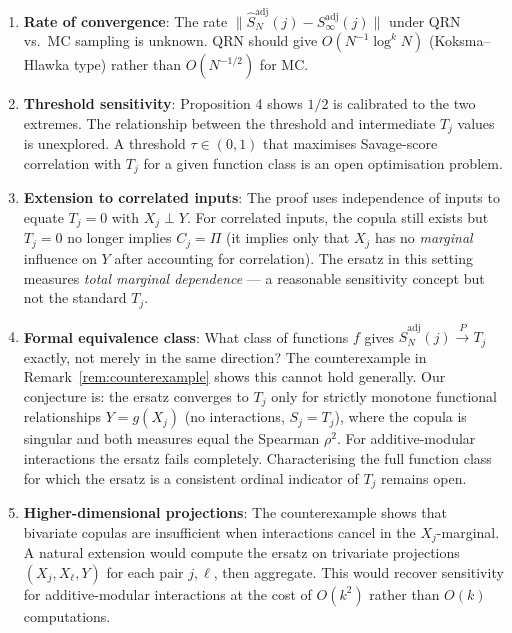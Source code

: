 \documentclass[11pt,a4paper]{article}
\theoremstyle{definition}
\begin{document}
\begin{enumerate}
\item \textbf{Rate of convergence}: The rate $\|\hat{S}^{\mathrm{adj}}_N(j) -
  S^{\mathrm{adj}}_\infty(j)\|$ under QRN vs.\ MC sampling is unknown.
  QRN should give $O(N^{-1}\log^k N)$ (Koksma–Hlawka type) rather than
  $O(N^{-1/2})$ for MC.

\item \textbf{Threshold sensitivity}: Proposition 4 shows $1/2$ is
  calibrated to the two extremes.  The relationship between the threshold
  and intermediate $T_j$ values is unexplored.  A threshold $\tau \in (0,1)$
  that maximises Savage-score correlation with $T_j$ for a given function
  class is an open optimisation problem.

\item \textbf{Extension to correlated inputs}: The proof uses independence
  of inputs to equate $T_j = 0$ with $X_j \perp Y$.  For correlated
  inputs, the copula still exists but $T_j = 0$ no longer implies $C_j = \Pi$
  (it implies only that $X_j$ has no \emph{marginal} influence on $Y$
  after accounting for correlation).  The ersatz in this setting measures
  \emph{total marginal dependence} — a reasonable sensitivity concept but
  not the standard $T_j$.

\item \textbf{Formal equivalence class}: What class of functions $f$ gives
  $\hat{S}^{\mathrm{adj}}_N(j) \xrightarrow{P} T_j$ exactly, not merely
  in the same direction?  The counterexample in
  Remark~\ref{rem:counterexample} shows this cannot hold generally.  Our
  conjecture is: the ersatz converges to $T_j$ only for strictly monotone
  functional relationships $Y = g(X_j)$ (no interactions, $S_j = T_j$),
  where the copula is singular and both measures equal the Spearman
  $\rho^2$.  For additive-modular interactions the ersatz fails
  completely.  Characterising the full function class for which the ersatz
  is a consistent ordinal indicator of $T_j$ remains open.

\item \textbf{Higher-dimensional projections}: The counterexample shows that
  bivariate copulas are insufficient when interactions cancel in the
  $X_j$-marginal.  A natural extension would compute the ersatz on
  trivariate projections $(X_j, X_\ell, Y)$ for each pair $j, \ell$,
  then aggregate.  This would recover sensitivity for additive-modular
  interactions at the cost of $O(k^2)$ rather than $O(k)$ computations.
\end{enumerate}



\end{document}
